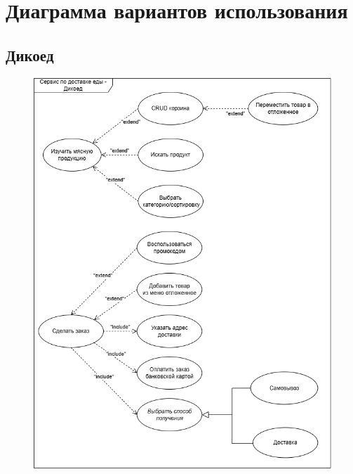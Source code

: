 \documentclass[a4paper]{report}
\begin{document}
\section{Диаграмма вариантов использования}
\subsection{Дикоед}
\begin{figure}[H]
    \centering
    \includegraphics[width=\textwidth]{Диаграмма вариантов использования Дикоед.png}
\end{figure}
\end{document}
